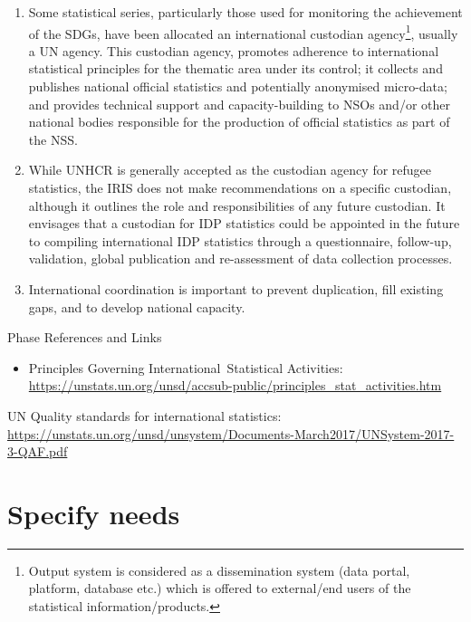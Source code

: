 \documentclass[
]{article}
\providecommand{\tightlist}{%
  \setlength{\itemsep}{0pt}\setlength{\parskip}{0pt}}
\begin{document}
\begin{enumerate}
\def\labelenumi{\arabic{enumi}.}
\setcounter{enumi}{19}
\item
  Some statistical series, particularly those used for monitoring the
  achievement of the SDGs, have been allocated an international
  custodian agency\footnote{Output system is considered as a dissemination system (data
    portal, platform, database etc.) which is offered to external/end
    users of the statistical information/products.}, usually a UN agency. This custodian agency,
  promotes adherence to international statistical principles for the
  thematic area under its control; it collects and publishes national
  official statistics and potentially anonymised micro-data; and
  provides technical support and capacity-building to NSOs and/or
  other national bodies responsible for the production of official
  statistics as part of the NSS.
\item
  While UNHCR is generally accepted as the custodian agency for
  refugee statistics, the IRIS does not make recommendations on a
  specific custodian, although it outlines the role and
  responsibilities of any future custodian. It envisages that a
  custodian for IDP statistics could be appointed in the future to
  compiling international IDP statistics through a questionnaire,
  follow-up, validation, global publication and re-assessment of data
  collection processes.
\item
  International coordination is important to prevent duplication, fill
  existing gaps, and to develop national capacity.
\end{enumerate}

Phase References and Links

\begin{itemize}
\tightlist
\item
  Principles Governing International~Statistical Activities:
  \url{https://unstats.un.org/unsd/accsub-public/principles_stat_activities.htm}
\end{itemize}

UN Quality standards for international statistics:
\url{https://unstats.un.org/unsd/unsystem/Documents-March2017/UNSystem-2017-3-QAF.pdf}

\hypertarget{specify-needs-1}{%
\section{Specify needs}\label{specify-needs-1}}
\end{document}
